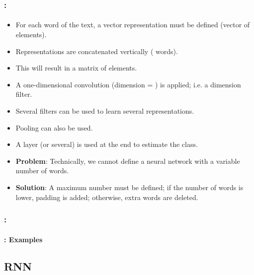 \documentclass[xcolor=table]{beamer}
\begin{document}
\begin{frame}
	\frametitle{\insertshortsubtitle: \insertsection}
	\framesubtitle{\insertsubsection}
	
	\begin{itemize}
		\item For each word of the text, a vector representation must be defined (vector of  elements).
		\item Representations are concatenated vertically ( words).
		\item This will result in a matrix of  elements.
		\item A one-dimensional convolution (dimension = ) is applied; i.e. a  dimension filter.
		\item Several filters can be used to learn several representations.
		\item Pooling can also be used.
		\item A  layer (or several) is used at the end to estimate the class.
		\item \textbf{Problem}: Technically, we cannot define a neural network with a variable number of words.
		\item \textbf{Solution}: \textcolor{yellow!50}{A maximum number must be defined; if the number of words is lower, padding is added; otherwise, extra words are deleted.}
	\end{itemize}
	
\end{frame}

\begin{frame}
	\frametitle{\insertshortsubtitle: \insertsection}
	\framesubtitle{\insertsubsection: Examples}
	
	
\end{frame}


\subsection{RNN}
\end{document}
